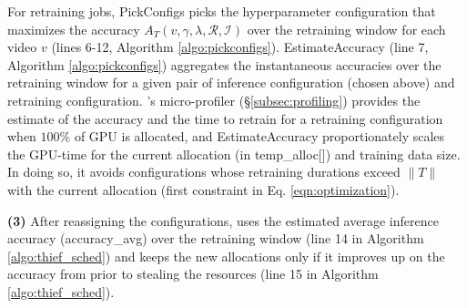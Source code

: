 For retraining jobs, {\sf\footnotesize PickConfigs} picks the hyperparameter configuration that maximizes the accuracy $A_T(v, \gamma, \lambda, \mathcal{R}, \mathcal{I})$ over the retraining window for each video $v$ (lines 6-12, Algorithm \ref{algo:pickconfigs}). {\sf\footnotesize EstimateAccuracy} (line 7, Algorithm \ref{algo:pickconfigs}) aggregates the instantaneous accuracies over the retraining window for a given pair of inference configuration (chosen above) and retraining configuration. {\name}'s micro-profiler (\S\ref{subsec:profiling}) provides the estimate of the accuracy and the time to retrain for a retraining configuration when $100\%$ of GPU is allocated, and {\sf\footnotesize EstimateAccuracy} proportionately scales the GPU-time for the current allocation (in {temp\_alloc[]}) and training data size. In doing so, it avoids configurations whose retraining durations exceed $\lVert T \rVert$ with the current allocation (first constraint in Eq. \ref{eqn:optimization}). %


{\bf (3)} After reassigning the configurations, {\name} uses the estimated average inference accuracy (accuracy\_avg) over the retraining window (line 14 in Algorithm \ref{algo:thief_sched}) and keeps the new allocations only if it improves up on the accuracy from prior to stealing the resources (line 15 in Algorithm \ref{algo:thief_sched}).




